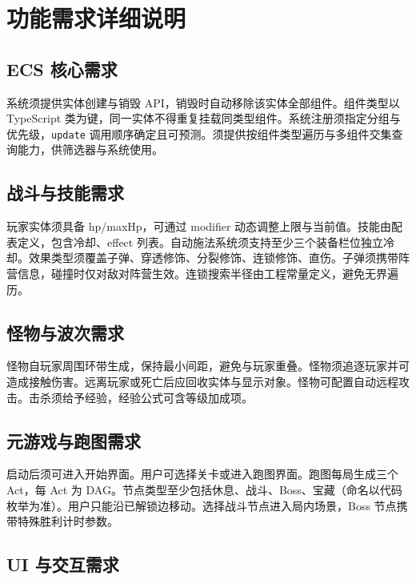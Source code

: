 ﻿
\section{功能需求详细说明}

\subsection{ECS 核心需求}

系统须提供实体创建与销毁 API，销毁时自动移除该实体全部组件。组件类型以 TypeScript 类为键，同一实体不得重复挂载同类型组件。系统注册须指定分组与优先级，\texttt{update} 调用顺序确定且可预测。须提供按组件类型遍历与多组件交集查询能力，供筛选器与系统使用\cite{gregory2018game}。

\subsection{战斗与技能需求}

玩家实体须具备 hp/maxHp，可通过 modifier 动态调整上限与当前值。技能由配表定义，包含冷却、effect 列表。自动施法系统须支持至少三个装备栏位独立冷却。效果类型须覆盖子弹、穿透修饰、分裂修饰、连锁修饰、直伤。子弹须携带阵营信息，碰撞时仅对敌对阵营生效。连锁搜索半径由工程常量定义，避免无界遍历\cite{helbing2000panic,gregory2018game}。

\subsection{怪物与波次需求}

怪物自玩家周围环带生成，保持最小间距，避免与玩家重叠。怪物须追逐玩家并可造成接触伤害。远离玩家或死亡后应回收实体与显示对象。怪物可配置自动远程攻击。击杀须给予经验，经验公式可含等级加成项\cite{gregory2018game}。

\subsection{元游戏与跑图需求}

启动后须可进入开始界面。用户可选择关卡或进入跑图界面。跑图每局生成三个 Act，每 Act 为 DAG。节点类型至少包括休息、战斗、Boss、宝藏（命名以代码枚举为准）。用户只能沿已解锁边移动。选择战斗节点进入局内场景，Boss 节点携带特殊胜利计时参数\cite{gregory2018game,gregory2018game}。

\subsection{UI 与交互需求}

